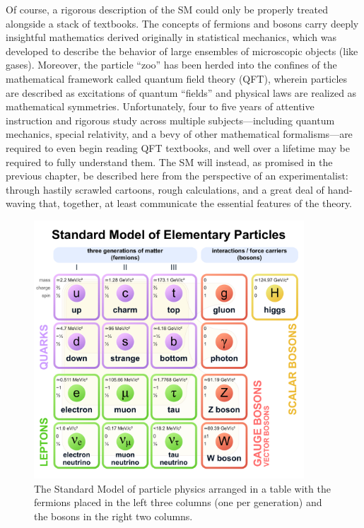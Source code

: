 Of course, a rigorous description of the SM could only be properly treated alongside a stack of textbooks. 
The concepts of fermions and bosons carry deeply insightful mathematics derived originally in statistical mechanics, which was developed to describe the behavior of large ensembles of microscopic objects (like gases). 
Moreover, the particle ``zoo'' has been herded into the confines of the mathematical framework called quantum field theory (QFT), wherein particles are described as excitations of quantum ``fields'' and physical laws are realized as mathematical symmetries. 
Unfortunately, four to five years of attentive instruction and rigorous study across multiple subjects---including quantum mechanics, special relativity, and a bevy of other mathematical formalisms---are required to even begin reading QFT textbooks, and well over a lifetime may be required to fully understand them\footnotemark{}. 
The SM will instead, as promised in the previous chapter, be described here from the perspective of an experimentalist: through hastily scrawled cartoons, rough calculations, and a great deal of hand-waving that, together, at least communicate the essential features of the theory. 

\begin{figure}[htb]
    \centering
    \includegraphics[width=0.9\textwidth]{fig/standard_model.pdf}
    \caption[The Standard Model of particle physics]{
        The Standard Model of particle physics arranged in a table with the fermions placed in the left three columns (one per generation) and the bosons in the right two columns.
    }
    \label{fig:standard_model}
\end{figure}


